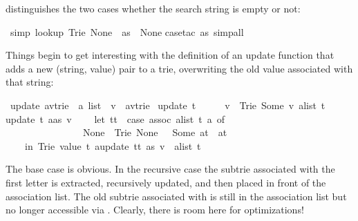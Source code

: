 \begin{isabellebody}
\begin{isamarkuptext}
distinguishes the two cases whether the search string is empty or not:%
\end{isamarkuptext}%
\isamarkuptrue%
\isamarkupfalse%
\ {\isacharbrackleft}simp{\isacharbrackright}{\isacharcolon}\ {\isachardoublequoteopen}lookup\ {\isacharparenleft}Trie\ None\ {\isacharbrackleft}{\isacharbrackright}{\isacharparenright}\ as\ {\isacharequal}\ None{\isachardoublequoteclose}\isanewline
%
\isadelimproof
%
\endisadelimproof
%
\isatagproof
{}\isamarkupfalse%
{\isacharparenleft}case{\isacharunderscore}tac\ as{\isacharcomma}\ simp{\isacharunderscore}all{\isacharparenright}\isanewline
{}\isamarkupfalse%
%
\endisatagproof
{\isafoldproof}%
%
\isadelimproof
%
\endisadelimproof
%
\begin{isamarkuptext}%
Things begin to get interesting with the definition of an update function
that adds a new (string, value) pair to a trie, overwriting the old value
associated with that string:%
\end{isamarkuptext}%
\isamarkuptrue%
\isamarkupfalse%
\ update{\isacharcolon}{\isacharcolon}\ {\isachardoublequoteopen}{\isacharparenleft}{\isacharprime}a{\isacharcomma}{\isacharprime}v{\isacharparenright}trie\ {\isasymRightarrow}\ {\isacharprime}a\ list\ {\isasymRightarrow}\ {\isacharprime}v\ {\isasymRightarrow}\ {\isacharparenleft}{\isacharprime}a{\isacharcomma}{\isacharprime}v{\isacharparenright}trie{\isachardoublequoteclose}\ \isanewline
{\isachardoublequoteopen}update\ t\ {\isacharbrackleft}{\isacharbrackright}\ \ \ \ \ v\ {\isacharequal}\ Trie\ {\isacharparenleft}Some\ v{\isacharparenright}\ {\isacharparenleft}alist\ t{\isacharparenright}{\isachardoublequoteclose}\ {\isacharbar}\isanewline
{\isachardoublequoteopen}update\ t\ {\isacharparenleft}a{\isacharhash}as{\isacharparenright}\ v\ {\isacharequal}\isanewline
\ \ \ {\isacharparenleft}let\ tt\ {\isacharequal}\ {\isacharparenleft}case\ assoc\ {\isacharparenleft}alist\ t{\isacharparenright}\ a\ of\isanewline
\ \ \ \ \ \ \ \ \ \ \ \ \ \ \ \ None\ {\isasymRightarrow}\ Trie\ None\ {\isacharbrackleft}{\isacharbrackright}\ {\isacharbar}\ Some\ at\ {\isasymRightarrow}\ at{\isacharparenright}\isanewline
\ \ \ \ in\ Trie\ {\isacharparenleft}value\ t{\isacharparenright}\ {\isacharparenleft}{\isacharparenleft}a{\isacharcomma}update\ tt\ as\ v{\isacharparenright}\ {\isacharhash}\ alist\ t{\isacharparenright}{\isacharparenright}{\isachardoublequoteclose}%
\begin{isamarkuptext}%
\noindent
The base case is obvious. In the recursive case the subtrie
 associated with the first letter  is extracted,
recursively updated, and then placed in front of the association list.
The old subtrie associated with  is still in the association list
but no longer accessible via . Clearly, there is room here for
optimizations!


\end{isamarkuptext}
\end{isabellebody}
